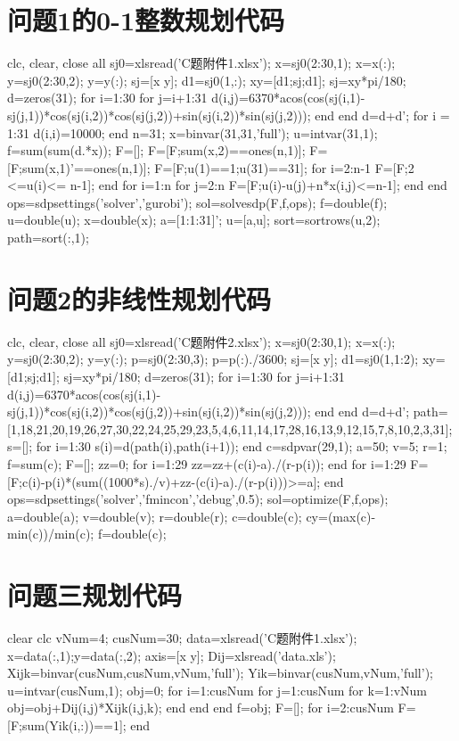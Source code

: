 \documentclass[withoutpreface,bwprint]{cumcmthesis} %
\begin{document}
\begin{appendices}
\section{问题1的0-1整数规划代码}
\begin{matlab}
clc, clear, close all
sj0=xlsread('C题附件1.xlsx');
x=sj0(2:30,1); x=x(:);
y=sj0(2:30,2); y=y(:);
sj=[x y]; d1=sj0(1,:); 
xy=[d1;sj;d1];
sj=xy*pi/180; %
d=zeros(31); %
for i=1:30
   for j=i+1:31
       d(i,j)=6370*acos(cos(sj(i,1)-sj(j,1))*cos(sj(i,2))*cos(sj(j,2))+sin(sj(i,2))*sin(sj(j,2)));
   end
end
d=d+d';
for i = 1:31
    d(i,i)=10000; 
end
n=31;
x=binvar(31,31,'full');
u=intvar(31,1);
f=sum(sum(d.*x));
F=[];
F=[F;sum(x,2)==ones(n,1)];
F=[F;sum(x,1)'==ones(n,1)];
F=[F;u(1)==1;u(31)==31];
for i=2:n-1
    F=[F;2 <=u(i)<= n-1];
end
for i=1:n
    for j=2:n
        F=[F;u(i)-u(j)+n*x(i,j)<=n-1];
    end
end
ops=sdpsettings('solver','gurobi');
sol=solvesdp(F,f,ops);
f=double(f);
u=double(u);
x=double(x);
a=[1:1:31]';
u=[a,u];
sort=sortrows(u,2);
path=sort(:,1);	
\end{matlab}
	
\section{问题2的非线性规划代码}	
\begin{matlab}
clc, clear, close all
sj0=xlsread('C题附件2.xlsx');
x=sj0(2:30,1); x=x(:);
y=sj0(2:30,2); y=y(:);
p=sj0(2:30,3); p=p(:)./3600;
sj=[x y]; d1=sj0(1,1:2); 
xy=[d1;sj;d1];
sj=xy*pi/180; %
d=zeros(31); %
for i=1:30
   for j=i+1:31
       d(i,j)=6370*acos(cos(sj(i,1)-sj(j,1))*cos(sj(i,2))*cos(sj(j,2))+sin(sj(i,2))*sin(sj(j,2)));
   end
end
d=d+d';
path=[1,18,21,20,19,26,27,30,22,24,25,29,23,5,4,6,11,14,17,28,16,13,9,12,15,7,8,10,2,3,31];%
s=[];
for i=1:30
    s(i)=d(path(i),path(i+1));
end
c=sdpvar(29,1);
a=50;
v=5;
r=1;
f=sum(c);
F=[];
zz=0;
for i=1:29
    zz=zz+(c(i)-a)./(r-p(i));
end
for i=1:29
    F=[F;c(i)-p(i)*(sum((1000*s)./v)+zz-(c(i)-a)./(r-p(i)))>=a];
end
ops=sdpsettings('solver','fmincon','debug',0.5);
sol=optimize(F,f,ops);
a=double(a);
v=double(v);
r=double(r);
c=double(c);
cy=(max(c)-min(c))/min(c);
f=double(c);
\end{matlab}
	
\section{问题三规划代码}
\begin{matlab}
clear
clc
vNum=4;  %
cusNum=30; %
data=xlsread('C题附件1.xlsx');
x=data(:,1);y=data(:,2);
axis=[x y]; %
Dij=xlsread('data.xls');
Xijk=binvar(cusNum,cusNum,vNum,'full');%
Yik=binvar(cusNum,vNum,'full'); %
u=intvar(cusNum,1);
obj=0;
for i=1:cusNum
    for j=1:cusNum
        for k=1:vNum
            obj=obj+Dij(i,j)*Xijk(i,j,k);
        end
    end
end
f=obj;
F=[];
for i=2:cusNum
    F=[F;sum(Yik(i,:))==1]; %
end


\end{matlab}
\end{appendices}
\end{document}
